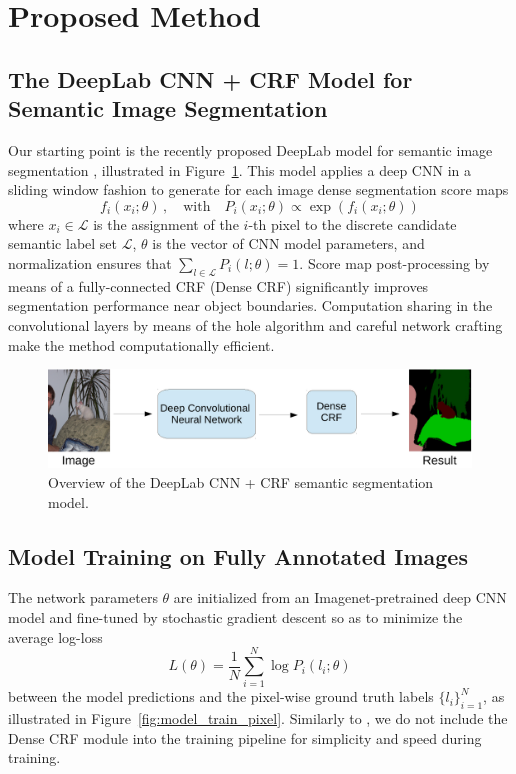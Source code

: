 \section{Proposed Method}

\subsection{The DeepLab CNN + CRF Model for Semantic Image Segmentation}

Our starting point is the recently proposed DeepLab model for semantic
image segmentation \cite{chen2014semantic}, illustrated in
Figure~\ref{fig:model_test}. This model applies a deep CNN in a
sliding window fashion to generate for each image dense segmentation
score maps 
\begin{equation}
  \label{eq:scores}
  f_i(x_i; \theta) \,,
  \quad \mathrm{with} \quad
  P_i(x_i; \theta) \propto \exp \left( f_i(x_i; \theta) \right)
\end{equation}
where $x_i \in \mathcal{L}$ is the assignment of the $i$-th pixel to
the discrete candidate semantic label set $\mathcal{L}$, $\theta$
is the vector of CNN model parameters, and normalization ensures
that $\sum_{l \in \mathcal{L}} P_i(l; \theta) = 1$. Score map
post-processing by means of a fully-connected CRF (Dense CRF)
\cite{krahenbuhl2011efficient} significantly improves segmentation
performance near object boundaries. Computation sharing in the
convolutional layers by means of the hole algorithm and careful
network crafting make the method computationally efficient.

\begin{figure}[htbp!]
  \centering
  \includegraphics[width=0.9\linewidth]{fig/model_test.pdf} 
  \caption{Overview of the DeepLab CNN + CRF semantic segmentation model.}
  \label{fig:model_test}
\end{figure}

\subsection{Model Training on Fully Annotated Images}
\label{sec:train_pixel}

The network parameters $\theta$ are initialized from an
Imagenet-pretrained deep CNN model \cite{simonyan2014very} and
fine-tuned by stochastic gradient descent so as to minimize the
average log-loss 
\begin{equation}
  \label{eq:log_loss}
  L(\theta) = \frac{1}{N} \sum_{i = 1}^N \log P_i(l_i; \theta)
\end{equation}
between the model predictions and the pixel-wise ground truth
labels $\{l_i\}_{i = 1}^N$, as illustrated in
Figure~\ref{fig:model_train_pixel}. Similarly to
\cite{chen2014semantic}, we do not include the Dense CRF module into
the training pipeline for simplicity and speed during training.

